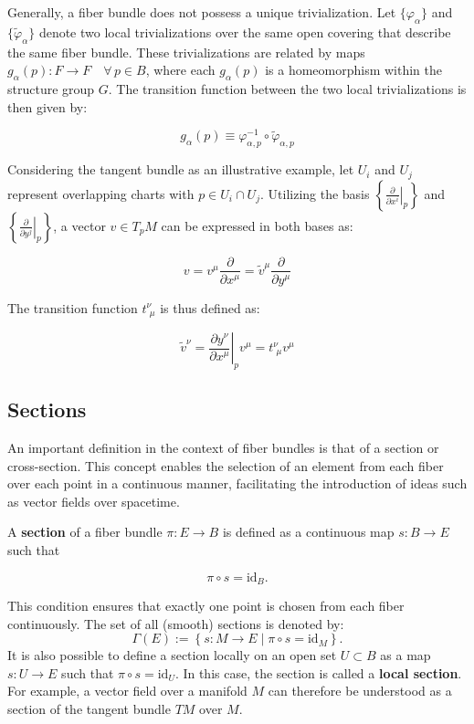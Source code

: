 Generally, a fiber bundle does not possess a unique trivialization. Let \(\{\varphi_\alpha\}\) and \(\{\tilde{\varphi}_\alpha\}\) denote two local trivializations over the same open covering that describe the same fiber bundle. These trivializations are related by maps \(g_\alpha(p) : F \to F \quad \forall\, p \in B\), where each \(g_\alpha(p)\) is a homeomorphism within the structure group \(G\). The transition function between the two local trivializations is then given by:

\[
g_\alpha(p) \equiv \varphi_{\alpha,p}^{-1} \circ \tilde{\varphi}_{\alpha,p}
\]

Considering the tangent bundle as an illustrative example\cite{NakaharaGeometrytopologyphysics2005}, let \(U_i\) and \(U_j\) represent overlapping charts with \(p \in U_i \cap U_j\). Utilizing the basis \(\left\{ \left. \frac{\partial}{\partial x^i} \right|_p \right\}\) and \(\left\{ \left. \frac{\partial}{\partial y^j} \right|_p \right\}\), a vector \(v \in T_pM\) can be expressed in both bases as:

\[
v = v^{\mu} \frac{\partial}{\partial x^{\mu}} = \tilde{v}^{\mu} \frac{\partial}{\partial y^{\mu}}
\]

The transition function \(t^\nu_{\,\,\mu}\) is thus defined as:

\[
\tilde{v}^\nu = \left.\frac{\partial y^\nu}{\partial x^\mu}\right|_p v^\mu = t^\nu_{\,\,\mu} v^\mu
\]

\subsection{Sections}

An important definition in the context of fiber bundles is that of a section or cross-section. This concept enables the selection of an element from each fiber over each point in a continuous manner, facilitating the introduction of ideas such as vector fields over spacetime\cite{NakaharaGeometrytopologyphysics2005}.

A \textbf{section} of a fiber bundle \(\pi : E \to B\) is defined as a continuous map \(s: B \to E\) such that

\[
\pi \circ s = \mathrm{id}_B.
\]

This condition ensures that exactly one point is chosen from each fiber continuously. 
The set of all (smooth) sections is denoted by:
\[
\Gamma(E) := \left\{ s: M \to E \mid \pi \circ s = \mathrm{id}_{M} \right\}.
\]
It is also possible to define a section locally on an open set \(U \subset B\) as a map \(s: U \to E\) such that \(\pi \circ s = \mathrm{id}_U\). In this case, the section is called a \textbf{local section}.
For example, a vector field over a manifold $M$ can therefore be understood as a section of the tangent bundle \(TM\) over \(M\).

